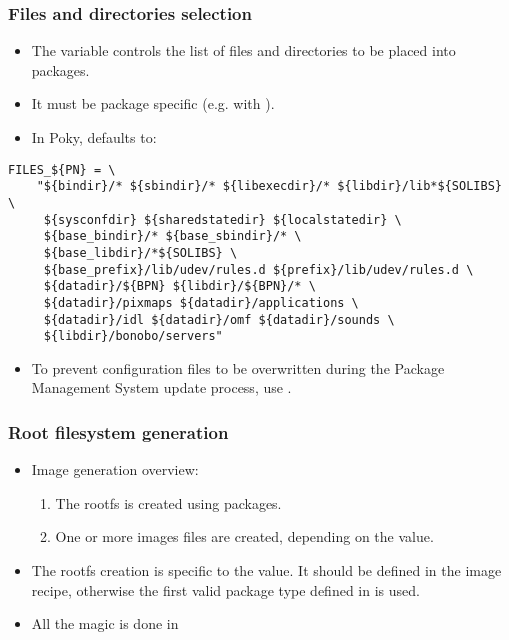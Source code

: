 \begin{frame}[fragile]
  \frametitle{Files and directories selection}
  \begin{itemize}
    \item The  variable controls the list of files and
      directories to be placed into packages.
    \item It must be package specific (e.g. with ).
    \item In Poky, defaults to:
  \end{itemize}
  \begin{block}{}
    \begin{verbatim}
FILES_${PN} = \
    "${bindir}/* ${sbindir}/* ${libexecdir}/* ${libdir}/lib*${SOLIBS} \
     ${sysconfdir} ${sharedstatedir} ${localstatedir} \
     ${base_bindir}/* ${base_sbindir}/* \
     ${base_libdir}/*${SOLIBS} \
     ${base_prefix}/lib/udev/rules.d ${prefix}/lib/udev/rules.d \
     ${datadir}/${BPN} ${libdir}/${BPN}/* \
     ${datadir}/pixmaps ${datadir}/applications \
     ${datadir}/idl ${datadir}/omf ${datadir}/sounds \
     ${libdir}/bonobo/servers"
    \end{verbatim}
  \end{block}
  \begin{itemize}
    \item To prevent configuration files to be overwritten during the
      Package Management System update process, use .
  \end{itemize}
\end{frame}

\begin{frame}
  \frametitle{Root filesystem generation}
  \begin{itemize}
    \item Image generation overview:
      \begin{enumerate}
        \item The rootfs is created using packages.
        \item One or more images files are created, depending on the
           value.
      \end{enumerate}
    \item The rootfs creation is specific to the 
      value. It should be defined in the image recipe, otherwise the
      first valid package type defined in  is
      used.
    \item All the magic is done in
  \end{itemize}
\end{frame}

